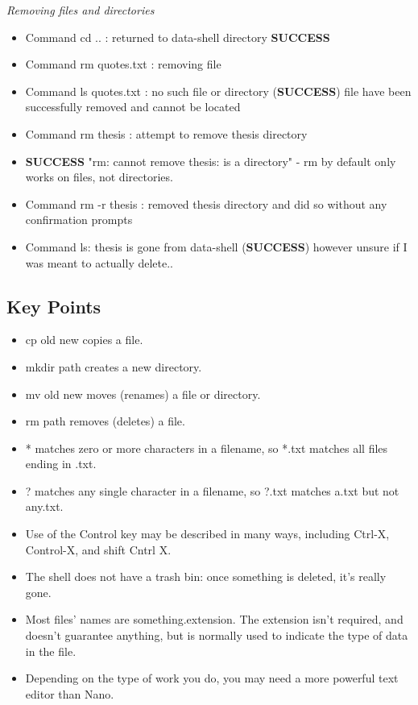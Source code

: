 \documentclass{article}
\begin{document}
\textit{Removing files and directories}
\begin{itemize}
\item Command cd .. : returned to data-shell directory \textbf{SUCCESS}
\item Command rm quotes.txt : removing file 
\item Command ls quotes.txt : no such file or directory (\textbf{SUCCESS}) file have been successfully removed and cannot be located
\item Command rm thesis : attempt to remove thesis directory
\item \textbf{SUCCESS} "rm: cannot remove thesis: is a directory" - rm by default only works on files, not directories.
\item Command rm -r thesis : removed thesis directory and did so without any confirmation prompts 
\item Command ls: thesis is gone from data-shell (\textbf{SUCCESS}) however unsure if I was meant to actually delete.. 
\end{itemize}

\subsection{Key Points}
\begin{itemize}
\item cp old new copies a file.
\item mkdir path creates a new directory.
\item mv old new moves (renames) a file or directory.
\item rm path removes (deletes) a file.
\item * matches zero or more characters in a filename, so *.txt matches all files ending in .txt.
\item ? matches any single character in a filename, so ?.txt matches a.txt but not any.txt.
\item Use of the Control key may be described in many ways, including Ctrl-X, Control-X, and shift Cntrl X.
\item The shell does not have a trash bin: once something is deleted, it’s really gone.
\item Most files’ names are something.extension. The extension isn’t required, and doesn’t guarantee anything, but is normally used to indicate the type of data in the file.
\item Depending on the type of work you do, you may need a more powerful text editor than Nano.
\end{itemize}
\end{document}
